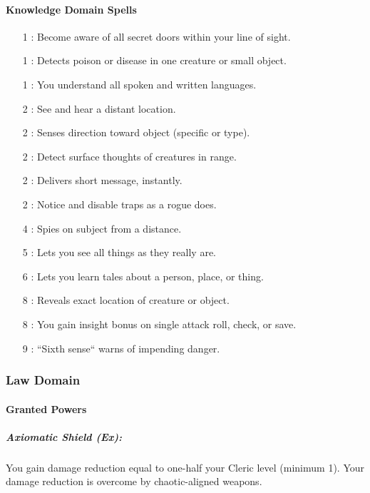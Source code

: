 \paragraph{Knowledge Domain Spells}
\begin{itemize}
\item[1] : Become aware of all secret doors within your line of sight.
\item[1] : Detects poison or disease in one creature or small object.
\item[1] : You understand all spoken and written languages.
\item[2] : See and hear a distant location.
\item[2] : Senses direction toward object (specific or type).
\item[2] : Detect surface thoughts of creatures in range.
\item[2] : Delivers short message, instantly.
\item[2] : Notice and disable traps as a rogue does.
\item[4] : Spies on subject from a distance.
\item[5] : Lets you see all things as they really are.
\item[6] : Lets you learn tales about a person, place, or thing.
\item[8] : Reveals exact location of creature or object.
\item[8] : You gain insight bonus on single attack roll, check, or save.
\item[9] : ``Sixth sense`` warns of impending danger.
\end{itemize}
\subsubsection{Law Domain}
\paragraph{Granted Powers}
\subparagraph{Axiomatic Shield (Ex):}
You gain damage reduction equal to one-half your Cleric level (minimum 1).
Your damage reduction is overcome by chaotic-aligned weapons.

